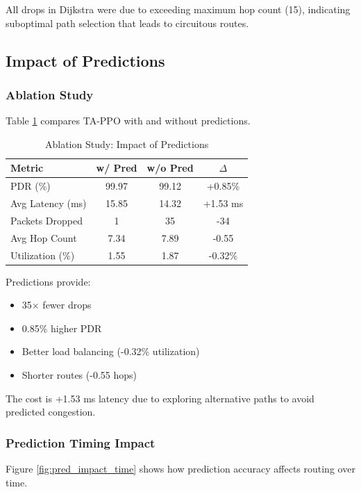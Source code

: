 All drops in Dijkstra were due to exceeding maximum hop count (15), indicating suboptimal path selection that leads to circuitous routes.

\subsection{Impact of Predictions}

\subsubsection{Ablation Study}

Table \ref{tab:ablation} compares TA-PPO with and without predictions.

\begin{table}[h]
\centering
\caption{Ablation Study: Impact of Predictions}
\label{tab:ablation}
\begin{tabular}{|l|c|c|c|}
\hline
\textbf{Metric} & \textbf{w/ Pred} & \textbf{w/o Pred} & \textbf{$\Delta$} \\
\hline
\hline
PDR (\%) & 99.97 & 99.12 & +0.85\% \\
Avg Latency (ms) & 15.85 & 14.32 & +1.53 ms \\
Packets Dropped & 1 & 35 & -34 \\
Avg Hop Count & 7.34 & 7.89 & -0.55 \\
Utilization (\%) & 1.55 & 1.87 & -0.32\% \\
\hline
\end{tabular}
\end{table}

Predictions provide:
\begin{itemize}
\item 35$\times$ fewer drops
\item 0.85\% higher PDR
\item Better load balancing (-0.32\% utilization)
\item Shorter routes (-0.55 hops)
\end{itemize}

The cost is +1.53 ms latency due to exploring alternative paths to avoid predicted congestion.

\subsubsection{Prediction Timing Impact}

Figure \ref{fig:pred_impact_time} shows how prediction accuracy affects routing over time.

